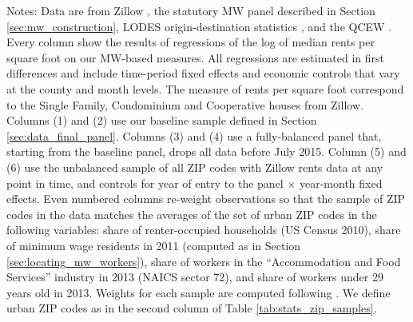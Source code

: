 \begin{landscape}
\begin{table}[hbt!]
    \begin{minipage}{.95\linewidth} \footnotesize
        \vspace{2mm}
        Notes:
        Data are from Zillow \parencite{ZillowData}, 
        the statutory MW panel described in Section \ref{sec:mw_construction}, 
        LODES origin-destination statistics \parencite{CensusLODES},
        and the QCEW \parencite{QCEW}.
        Every column show the results of regressions of the log of 
        median rents per square foot on our MW-based measures.
        All regressions are estimated in first differences and include 
        time-period fixed effects and economic controls that vary at the 
        county and month levels.
        The measure of rents per square foot correspond to the Single Family, 
        Condominium and Cooperative houses from Zillow.
        Columns (1) and (2) use our baseline sample defined in Section 
        \ref{sec:data_final_panel}.
        Columns (3) and (4) use a fully-balanced panel that, starting from the 
        baseline panel, drops all data before July 2015.
        Column (5) and (6) use the unbalanced sample of all ZIP codes with 
        Zillow rents data at any point in time, and controls for year of entry 
        to the panel $\times$ year-month fixed effects.
        Even numbered columns re-weight observations so that the sample of 
        ZIP codes in the data matches the averages of the set of urban 
        ZIP codes in the following variables:
        share of renter-occupied households (US Census 2010),
        share of minimum wage residents in 2011 (computed as in Section 
        \ref{sec:locating_mw_workers}),
        share of workers in the ``Accommodation and Food Services'' industry 
        in 2013 (NAICS sector 72),
        and share of workers under 29 years old in 2013.
        Weights for each sample are computed following \textcite{Hainmueller2012}.
        We define urban ZIP codes as in the second column of Table 
        \ref{tab:stats_zip_samples}.
    \end{minipage}
\end{table}
\end{landscape}
